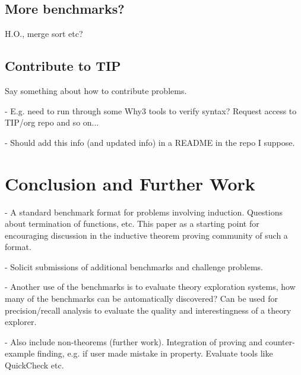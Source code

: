 \documentclass{llncs}
\begin{document}
\subsection{More benchmarks?}
H.O., merge sort etc?

%
%
%
%

\subsection{Contribute to TIP}
Say something about how to contribute problems. 

- E.g. need to run through some Why3 tools to verify syntax? Request access to TIP/org repo and so on...

- Should add this info (and updated info) in a README in the repo I suppose.

\section{Conclusion and Further Work}
- A standard benchmark format for problems involving induction. Questions about termination of functions, etc. This paper as a starting point for encouraging discussion in the inductive theorem proving community of such a format.

- Solicit submissions of additional benchmarks and challenge problems.

- Another use of the benchmarks is to evaluate theory exploration systems, how many of the benchmarks can be automatically discovered? Can be used for precision/recall analysis to evaluate the quality and interestingness of a theory explorer.

- Also include non-theorems (further work). Integration of proving and counter-example finding, e.g. if user made mistake in property. Evaluate tools like QuickCheck etc.



\end{document}
